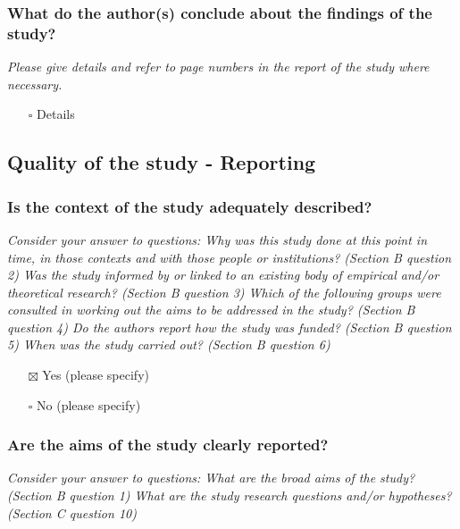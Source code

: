 \documentclass[
  doc, a4paper]{apa7}
\providecommand{\tightlist}{%
  \setlength{\itemsep}{0pt}\setlength{\parskip}{0pt}}
\begin{document}
\subsubsection{What do the author(s) conclude about the findings of the study?}\label{what-do-the-authors-conclude-about-the-findings-of-the-study}

\emph{Please give details and refer to page numbers in the report of the study where necessary.}

\begin{itemize}
\tightlist
\item[$\square$]
  Details
\end{itemize}

\subsection{Quality of the study - Reporting}\label{quality-of-the-study---reporting}

\subsubsection{Is the context of the study adequately described?}\label{is-the-context-of-the-study-adequately-described}

\emph{Consider your answer to questions: Why was this study done at this point in time, in those contexts and with those people or institutions? (Section B question 2) Was the study informed by or linked to an existing body of empirical and/or theoretical research? (Section B question 3) Which of the following groups were consulted in working out the aims to be addressed in the study? (Section B question 4) Do the authors report how the study was funded? (Section B question 5) When was the study carried out? (Section B question 6)}

\begin{itemize}
\tightlist
\item[$\boxtimes$]
  Yes (please specify)
\item[$\square$]
  No (please specify)
\end{itemize}

\subsubsection{Are the aims of the study clearly reported?}\label{are-the-aims-of-the-study-clearly-reported}

\emph{Consider your answer to questions: What are the broad aims of the study? (Section B question 1) What are the study research questions and/or hypotheses? (Section C question 10)}
\end{document}
